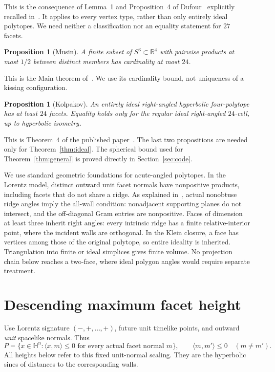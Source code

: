 \documentclass[11pt]{article}
\newtheorem{proposition}[theorem]{Proposition}
\theoremstyle{remark}
\newcommand{\HH}{\mathbb H}
\newcommand{\RR}{\mathbb R}
\newcommand{\ip}[2]{\langle #1,#2\rangle}
\begin{document}
This is the consequence of Lemma~1 and Proposition~4 of
Dufour~\cite{Dufour} explicitly recalled in~\cite[Section~4]{Alex}.
It applies to every vertex type, rather than only entirely ideal
polytopes. We need neither a classification nor an equality statement
for $27$ facets.

\begin{proposition}[Musin]\label{prop:musin}
A finite subset of $S^3\subset\RR^4$ with pairwise products at most
$1/2$ between distinct members has cardinality at most $24$.
\end{proposition}

This is the Main theorem of~\cite[p.~4]{Musin}. We use its
cardinality bound, not uniqueness of a kissing configuration.

\begin{proposition}[Kolpakov]\label{prop:24}
An entirely ideal right-angled hyperbolic four-polytope has at least
$24$ facets. Equality holds only for the regular ideal right-angled
$24$-cell, up to hyperbolic isometry.
\end{proposition}

This is Theorem~4 of the published paper~\cite[p.~1945]{Kolpakov}.
The last two propositions are needed only for Theorem~\ref{thm:ideal}.
The spherical bound used for Theorem~\ref{thm:general} is proved
directly in Section~\ref{sec:code}.

We use standard geometric foundations for acute-angled polytopes.
In the Lorentz model, distinct outward unit facet normals have
nonpositive products, including facets that do not share a ridge.
As explained in~\cite[p.~42, \S2.1]{Vinberg}, actual nonobtuse ridge
angles imply the all-wall condition: nonadjacent supporting planes
do not intersect, and the off-diagonal Gram entries are nonpositive.
Faces of dimension at least three inherit right angles: every
intrinsic ridge has a finite relative-interior point, where the
incident walls are orthogonal. In the Klein closure, a face has
vertices among those of the original polytope, so entire ideality is
inherited. Triangulation into finite or ideal simplices gives finite
volume. No projection chain below reaches a two-face, where ideal
polygon angles would require separate treatment.

\section{Descending maximum facet height}\label{sec:descent}

Use Lorentz signature $(-,+,\ldots,+)$, future unit timelike points,
and outward \emph{unit} spacelike normals. Thus
\[
 P=\{x\in\HH^n:\ip{x}{m}\le0\text{ for every actual facet normal }m\},
 \qquad \ip{m}{m'}\le0\quad(m\ne m').
\]
All heights below refer to this fixed unit-normal scaling. They are
the hyperbolic sines of distances to the corresponding walls.
\end{document}
